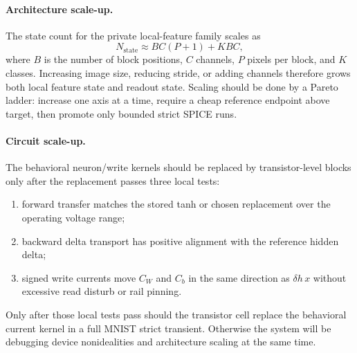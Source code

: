 \documentclass[11pt]{article}
\begin{document}
\paragraph{Architecture scale-up.}
The state count for the private local-feature family scales as
\[
  N_{\mathrm{state}}
  \approx
  B C(P+1) + KBC,
\]
where \(B\) is the number of block positions, \(C\) channels, \(P\) pixels per
block, and \(K\) classes.  Increasing image size, reducing stride, or adding
channels therefore grows both local feature state and readout state.  Scaling
should be done by a Pareto ladder: increase one axis at a time, require a cheap
reference endpoint above target, then promote only bounded strict SPICE runs.

\paragraph{Circuit scale-up.}
The behavioral neuron/write kernels should be replaced by transistor-level
blocks only after the replacement passes three local tests:
\begin{enumerate}
  \item forward transfer matches the stored tanh or chosen replacement over
    the operating voltage range;
  \item backward delta transport has positive alignment with the reference
    hidden delta;
  \item signed write currents move \(C_W\) and \(C_b\) in the same direction as
    \(\delta h\,x\) without excessive read disturb or rail pinning.
\end{enumerate}

Only after those local tests pass should the transistor cell replace the
behavioral current kernel in a full MNIST strict transient.  Otherwise the
system will be debugging device nonidealities and architecture scaling at the
same time.
\end{document}
